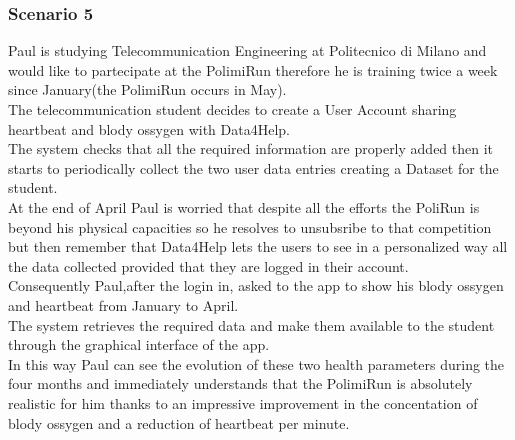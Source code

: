      \subsubsection{Scenario 5}
     Paul is studying Telecommunication Engineering at Politecnico di Milano and would like to partecipate at the PolimiRun therefore he is training twice a week since January(the PolimiRun occurs in May).\\ The telecommunication student decides to create a User Account sharing heartbeat and blody ossygen with Data4Help. \\The system checks that all the required information are properly added then it starts to periodically collect the two user data entries creating a Dataset for the student. 
\\At the end of April Paul is worried that despite all the efforts the PoliRun is beyond his physical capacities so he resolves to unsubsribe to that competition but then remember that Data4Help lets the users to see in a personalized way all the data collected provided that they are logged in their account. \\Consequently Paul,after the login in, asked to the app to show his blody ossygen and heartbeat from January to April. \\The system retrieves the required data and make them available to the student through the graphical interface of the app.\\ In this way Paul can see the evolution of these two health parameters during the four months and immediately understands that the PolimiRun is absolutely realistic for him thanks to an impressive improvement in the concentation of blody ossygen and a reduction of heartbeat per minute.

